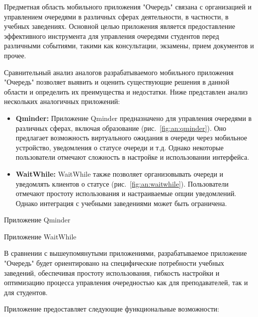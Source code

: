 

Предметная область мобильного приложения "Очередь" связана с организацией
и управлением очередями в различных сферах деятельности, в частности,
в учебных заведениях. Основной целью приложения является предоставление
эффективного инструмента для управления очередями студентов перед различными
событиями, такими как консультации, экзамены, прием документов и прочее.

Сравнительный анализ аналогов разрабатываемого мобильного приложения "Очередь"
позволяет выявить и оценить существующие решения в данной области
и определить их преимущества и недостатки.
Ниже представлен анализ нескольких аналогичных приложений:

\begin{itemize}
	\item \textbf{Qminder:} Приложение Qminder предназначено
		для управления очередями в различных сферах,
		включая образование (рис.~\ref{fig:an:qminder}).
		Оно предлагает возможность виртуального ожидания
		в очереди через мобильное устройство,
		уведомления о статусе очереди и т.д.
		Однако некоторые пользователи отмечают сложность в настройке
		и использовании интерфейса.
	\item \textbf{WaitWhile:} WaitWhile также позволяет организовывать
		очереди и уведомлять клиентов о статусе (рис.~\ref{fig:an:waitwhile}).
		Пользователи отмечают простоту использования
		и настраиваемые опции уведомлений.
		Однако интеграция с учебными заведениями может быть ограничена.
\end{itemize}

\begin{image}
	\caption{Приложение Qminder}
	\label{fig:an:qminder}
\end{image}

\begin{image}
	\caption{Приложение WaitWhile}
	\label{fig:an:waitwhile}
\end{image}

В сравнении с вышеупомянутыми приложениями,
разрабатываемое приложение "Очередь" будет ориентировано
на специфические потребности учебных заведений,
обеспечивая простоту использования, гибкость настройки
и оптимизацию процесса управления очередностью как для преподавателей,
так и для студентов.\par
Приложение предоставляет следующие функциональные возможности:

